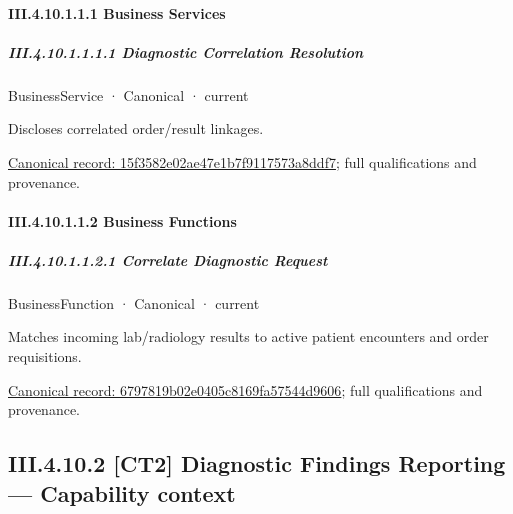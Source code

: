 \paragraph*{III.4.10.1.1.1 Business Services}
\label{navigation:III.4.10.1.1.1}

\subparagraph*{III.4.10.1.1.1.1 Diagnostic Correlation Resolution}
\label{navigation:III.4.10.1.1.1.1}

\label{element:15f3582e02ae47e1b7f9117573a8ddf7}
{\small BusinessService · Canonical · current}\par

Discloses correlated order/result linkages.


{\footnotesize \href{../../../../continuum/business/business-service/15f3582e02ae47e1b7f9117573a8ddf7.md}{Canonical record: 15f3582e02ae47e1b7f9117573a8ddf7}; full qualifications and provenance.}\par
\paragraph*{III.4.10.1.1.2 Business Functions}
\label{navigation:III.4.10.1.1.2}

\subparagraph*{III.4.10.1.1.2.1 Correlate Diagnostic Request}
\label{navigation:III.4.10.1.1.2.1}

\label{element:6797819b02e0405c8169fa57544d9606}
{\small BusinessFunction · Canonical · current}\par

Matches incoming lab/radiology results to active patient encounters and order requisitions.


{\footnotesize \href{../../../../continuum/business/business-function/6797819b02e0405c8169fa57544d9606.md}{Canonical record: 6797819b02e0405c8169fa57544d9606}; full qualifications and provenance.}\par
\subsection*{III.4.10.2 [CT2] Diagnostic Findings Reporting — Capability context}
\label{navigation:III.4.10.2}

